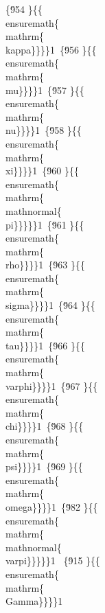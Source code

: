{\{\u954 \}\{\{\\ensuremath\{\\mathrm\{\\kappa\}\}\}\}1\
\{\u956 \}\{\{\\ensuremath\{\\mathrm\{\\mu\}\}\}\}1\
\{\u957 \}\{\{\\ensuremath\{\\mathrm\{\\nu\}\}\}\}1\
\{\u958 \}\{\{\\ensuremath\{\\mathrm\{\\xi\}\}\}\}1\
\{\u960 \}\{\{\\ensuremath\{\\mathrm\{\\mathnormal\{\\pi\}\}\}\}\}1\
\{\u961 \}\{\{\\ensuremath\{\\mathrm\{\\rho\}\}\}\}1\
\{\u963 \}\{\{\\ensuremath\{\\mathrm\{\\sigma\}\}\}\}1\
\{\u964 \}\{\{\\ensuremath\{\\mathrm\{\\tau\}\}\}\}1\
\{\u966 \}\{\{\\ensuremath\{\\mathrm\{\\varphi\}\}\}\}1\
\{\u967 \}\{\{\\ensuremath\{\\mathrm\{\\chi\}\}\}\}1\
\{\u968 \}\{\{\\ensuremath\{\\mathrm\{\\psi\}\}\}\}1\
\{\u969 \}\{\{\\ensuremath\{\\mathrm\{\\omega\}\}\}\}1\
\{\u982 \}\{\{\\ensuremath\{\\mathrm\{\\mathnormal\{\\varpi\}\}\}\}\}1 %
\
\{\uc0\u915 \}\{\{\\ensuremath\{\\mathrm\{\\Gamma\}\}\}\}1\
}
